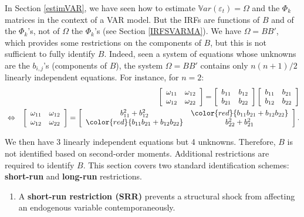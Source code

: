 \documentclass[
  12pt,
]{book}
\providecommand{\tightlist}{%
  \setlength{\itemsep}{0pt}\setlength{\parskip}{0pt}}
\theoremstyle{definition}
\theoremstyle{definition}
\theoremstyle{definition}
\theoremstyle{definition}
\theoremstyle{remark}
\begin{document}
In Section \ref{estimVAR}, we have seen how to estimate \(\mathbb{V}ar(\varepsilon_t) =\Omega\) and the \(\Phi_k\) matrices in the context of a VAR model. But the IRFs are functions of \(B\) and of the \(\Phi_k\)'s, not of \(\Omega\) the \(\Phi_k\)'s (see Section \ref{IRFSVARMA}). We have \(\Omega = BB'\), which provides some restrictions on the components of \(B\), but this is not sufficient to fully identify \(B\). Indeed, seen a system of equations whose unknowns are the \(b_{i,j}\)'s (components of \(B\)), the system \(\Omega = BB'\) contains only \(n(n+1)/2\) linearly independent equations. For instance, for \(n=2\):
\begin{eqnarray*}
&&\left[
\begin{array}{cc}
\omega_{11} & \omega_{12} \\
\omega_{12} & \omega_{22}
\end{array}
\right] = \left[
\begin{array}{cc}
b_{11} & b_{12} \\
b_{21} & b_{22}
\end{array}
\right]\left[
\begin{array}{cc}
b_{11} & b_{21} \\
b_{12} & b_{22}
\end{array}
\right]\\
&\Leftrightarrow&\left[
\begin{array}{cc}
\omega_{11} & \omega_{12} \\
\omega_{12} & \omega_{22}
\end{array}
\right] = \left[
\begin{array}{cc}
b_{11}^2+b_{12}^2 & \color{red}{b_{11}b_{21}+b_{12}b_{22}} \\
\color{red}{b_{11}b_{21}+b_{12}b_{22}} & b_{22}^2 + b_{21}^2
\end{array}
\right].
\end{eqnarray*}

We then have 3 linearly independent equations but 4 unknowns. Therefore, \(B\) is not identified based on second-order moments. Additional restrictions are required to identify \(B\). This section covers two standard identification schemes: \textbf{short-run} and \textbf{long-run} restrictions.

\begin{enumerate}
\def\labelenumi{\arabic{enumi}.}
\tightlist
\item
  A \textbf{short-run restriction (SRR)} prevents a structural shock from affecting an endogenous variable contemporaneously.
\end{enumerate}
\end{document}
